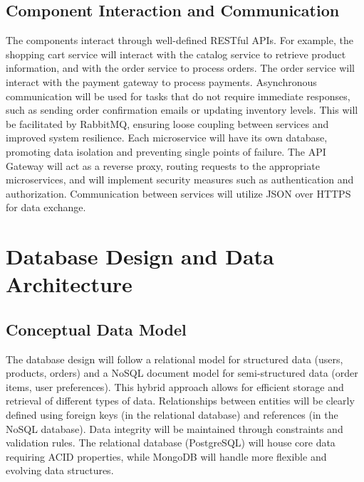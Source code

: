 \documentclass[11pt,a4paper,oneside]{article}
\begin{document}
\subsection{Component Interaction and Communication}

The components interact through well-defined RESTful APIs.  For example, the shopping cart service will interact with the catalog service to retrieve product information, and with the order service to process orders.  The order service will interact with the payment gateway to process payments.  Asynchronous communication will be used for tasks that do not require immediate responses, such as sending order confirmation emails or updating inventory levels. This will be facilitated by RabbitMQ, ensuring loose coupling between services and improved system resilience.  Each microservice will have its own database, promoting data isolation and preventing single points of failure.  The API Gateway will act as a reverse proxy, routing requests to the appropriate microservices, and will implement security measures such as authentication and authorization.  Communication between services will utilize JSON over HTTPS for data exchange.

\section{Database Design and Data Architecture}

\subsection{Conceptual Data Model}

The database design will follow a relational model for structured data (users, products, orders) and a NoSQL document model for semi-structured data (order items, user preferences).  This hybrid approach allows for efficient storage and retrieval of different types of data.  Relationships between entities will be clearly defined using foreign keys (in the relational database) and references (in the NoSQL database).   Data integrity will be maintained through constraints and validation rules.  The relational database (PostgreSQL) will house core data requiring ACID properties, while MongoDB will handle more flexible and evolving data structures.
\end{document}
